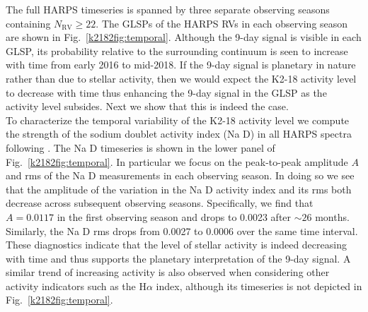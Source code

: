 The full HARPS timeseries is spanned by three separate observing seasons
containing $N_{\text{RV}} \geq 22$. The GLSPs of the HARPS RVs in each observing season are shown in
Fig.~\ref{k2182fig:temporal}. Although the 9-day signal is visible in each GLSP, its probability relative to the
surrounding continuum is seen to increase with time from early 2016 to mid-2018.
If the 9-day signal is planetary in nature rather than 
due to stellar activity, then we would expect the K2-18 activity level to decrease with time thus enhancing the 9-day
signal in the GLSP as the activity level subsides. Next we  show that this is indeed the case. \\

To characterize the temporal variability of the K2-18 activity level we compute the strength of the sodium doublet
activity index (Na D) in all HARPS spectra following \cite{astudillodefru17b}. The Na D timeseries is shown in the lower
panel of Fig.~\ref{k2182fig:temporal}. In particular we focus on the peak-to-peak amplitude $A$ and rms of the Na D measurements in each
observing season. In doing so we see that the amplitude of
the variation in the Na D activity index and its rms both decrease across subsequent observing seasons. Specifically, we find that
$A=0.0117$ in the first observing season and drops to 0.0023 after $\sim 26$ months. Similarly, the Na D rms drops from 0.0027
to 0.0006 over the same time interval. These diagnostics indicate that 
the level of stellar activity is indeed decreasing with time and thus supports the planetary interpretation of the 9-day signal.
A similar trend of increasing activity is also observed when considering other activity
indicators such as the H$\alpha$ index, although its timeseries is not depicted in Fig.~\ref{k2182fig:temporal}.

